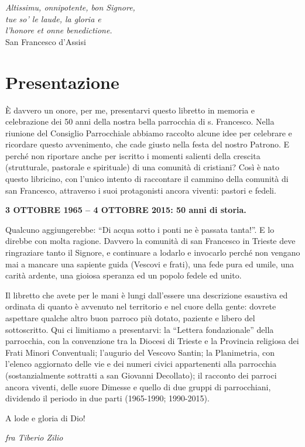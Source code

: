 \thispagestyle{empty}
\vspace*{15ex}
\begin{flushright}
\textit{Altissimu, onnipotente, bon Signore,\\
tue so’ le laude, la gloria e \\
l’honore et onne benedictione.\\}
\vspace{2ex}
\scriptsize{San Francesco d'Assisi}
\end{flushright}
\cleardoublepage

\chapter*{Presentazione}
\label{chap:abstract}
È davvero un onore, per me, presentarvi questo libretto in memoria e celebrazione dei 
50 anni della nostra bella parrocchia di s. Francesco. Nella riunione del Consiglio Parrocchiale 
abbiamo raccolto alcune idee per celebrare e ricordare questo avvenimento, che cade giusto nella 
festa del nostro Patrono. E perché non riportare anche per iscritto i momenti salienti della crescita 
(strutturale, pastorale e spirituale) di una comunità di cristiani? Così è nato questo libricino, con 
l’unico intento di raccontare il cammino della comunità di san Francesco, attraverso i suoi 
protagonisti ancora viventi: pastori e fedeli.
\begin{center}
\bfseries
3 OTTOBRE 1965 – 4 OTTOBRE 2015: 50 anni di storia.
\end{center}

Qualcuno aggiungerebbe: “Di acqua sotto i ponti ne è passata tanta!”. E lo direbbe con molta 
ragione. Davvero la comunità di san Francesco in Trieste deve ringraziare tanto il Signore, e 
continuare a lodarlo e invocarlo perché non vengano mai a mancare una sapiente guida (Vescovi e 
frati), una fede pura ed umile, una carità ardente, una gioiosa speranza ed un popolo fedele ed unito. 
\bigbreak

Il libretto che avete per le mani è lungi dall’essere una descrizione esaustiva ed ordinata di 
quanto è avvenuto nel territorio e nel cuore della gente: dovrete aspettare qualche altro buon 
parroco più dotato, paziente e libero del sottoscritto.
Qui ci limitiamo a presentarvi: la “Lettera fondazionale” della parrocchia, con la convenzione tra la 
Diocesi di Trieste e la Provincia religiosa dei Frati Minori Conventuali; l’augurio del Vescovo 
Santin; la Planimetria, con l’elenco aggiornato delle vie e dei numeri civici appartenenti alla 
parrocchia (sostanzialmente sottratti a san Giovanni Decollato); il racconto dei parroci  ancora 
viventi, delle suore Dimesse e quello di due gruppi di parrocchiani, dividendo il periodo in due parti 
(1965-1990; 1990-2015).
 
A lode e gloria di Dio!
\begin{flushright}
	\textit{fra Tiberio Zilio}
\end{flushright}